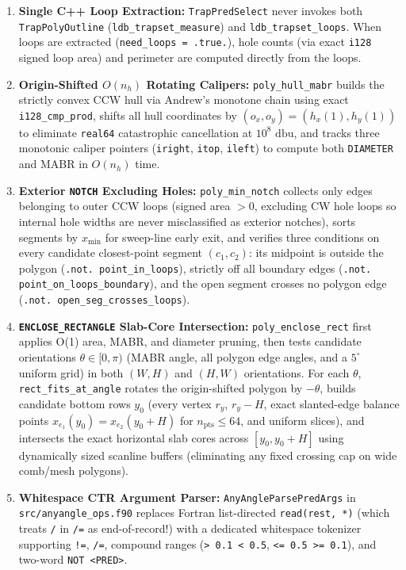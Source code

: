 \begin{enumerate}
  \item \textbf{Single C++ Loop Extraction:} \texttt{TrapPredSelect} never invokes both \texttt{TrapPolyOutline} (\texttt{ldb\_trapset\_measure}) and \texttt{ldb\_trapset\_loops}. When loops are extracted (\texttt{need\_loops = .true.}), hole counts (via exact \texttt{i128} signed loop area) and perimeter are computed directly from the loops.
  \item \textbf{Origin-Shifted $O(n_h)$ Rotating Calipers:} \texttt{poly\_hull\_mabr} builds the strictly convex CCW hull via Andrew's monotone chain using exact \texttt{i128\_cmp\_prod}, shifts all hull coordinates by $(o_x, o_y) = (h_x(1), h_y(1))$ to eliminate \texttt{real64} catastrophic cancellation at $10^8\text{ dbu}$, and tracks three monotonic caliper pointers (\texttt{iright}, \texttt{itop}, \texttt{ileft}) to compute both \texttt{DIAMETER} and MABR in $O(n_h)$ time.
  \item \textbf{Exterior \texttt{NOTCH} Excluding Holes:} \texttt{poly\_min\_notch} collects only edges belonging to outer CCW loops (signed area $> 0$, excluding CW hole loops so internal hole widths are never misclassified as exterior notches), sorts segments by $x_{\min}$ for sweep-line early exit, and verifies three conditions on every candidate closest-point segment $(c_1, c_2)$: its midpoint is outside the polygon (\texttt{.not. point\_in\_loops}), strictly off all boundary edges (\texttt{.not. point\_on\_loops\_boundary}), and the open segment crosses no polygon edge (\texttt{.not. open\_seg\_crosses\_loops}).
  \item \textbf{\texttt{ENCLOSE\_RECTANGLE} Slab-Core Intersection:} \texttt{poly\_enclose\_rect} first applies O(1) area, MABR, and diameter pruning, then tests candidate orientations $\theta \in [0, \pi)$ (MABR angle, all polygon edge angles, and a $5^\circ$ uniform grid) in both $(W, H)$ and $(H, W)$ orientations. For each $\theta$, \texttt{rect\_fits\_at\_angle} rotates the origin-shifted polygon by $-\theta$, builds candidate bottom rows $y_0$ (every vertex $r_y$, $r_y - H$, exact slanted-edge balance points $x_{e_1}(y_0) = x_{e_2}(y_0 + H)$ for $n_{\text{pts}} \le 64$, and uniform slices), and intersects the exact horizontal slab cores across $[y_0, y_0 + H]$ using dynamically sized scanline buffers (eliminating any fixed crossing cap on wide comb/mesh polygons).
  \item \textbf{Whitespace CTR Argument Parser:} \texttt{AnyAngleParsePredArgs} in \texttt{src/anyangle\_ops.f90} replaces Fortran list-directed \texttt{read(rest, *)} (which treats \texttt{/} in \texttt{/=} as end-of-record!) with a dedicated whitespace tokenizer supporting \texttt{!=}, \texttt{/=}, compound ranges (\texttt{> 0.1 < 0.5}, \texttt{<= 0.5 >= 0.1}), and two-word \texttt{NOT <PRED>}.
\end{enumerate}

